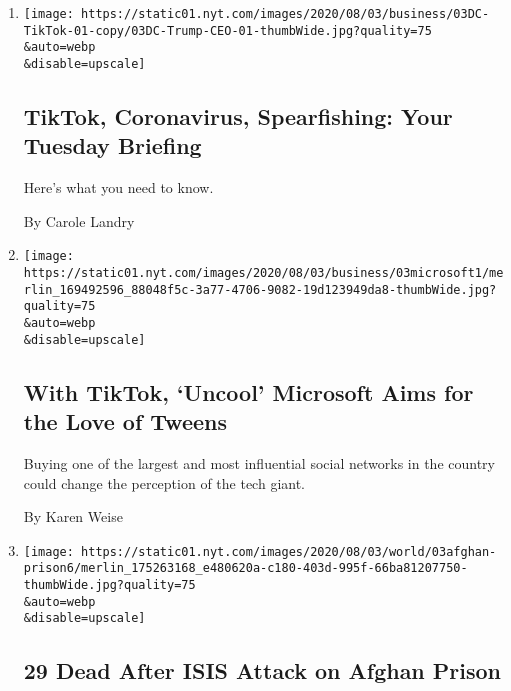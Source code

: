 \begin{enumerate}
\def\labelenumi{\arabic{enumi}.}
\item
  \href{/2020/08/03/briefing/coronavirus-tiktok-afghanistan-australia.html}{}

  \texttt{[image: https://static01.nyt.com/images/2020/08/03/business/03DC-TikTok-01-copy/03DC-Trump-CEO-01-thumbWide.jpg?quality=75\\\&auto=webp\\\&disable=upscale]}

  \hypertarget{tiktok-coronavirus-spearfishing-your-tuesday-briefing}{%
  \subsection{TikTok, Coronavirus, Spearfishing: Your Tuesday
  Briefing}\label{tiktok-coronavirus-spearfishing-your-tuesday-briefing}}

  Here's what you need to know.

  By Carole Landry
\item
  \href{/2020/08/03/technology/tiktok-microsoft-tweens.html}{}

  \texttt{[image: https://static01.nyt.com/images/2020/08/03/business/03microsoft1/merlin\_169492596\_88048f5c-3a77-4706-9082-19d123949da8-thumbWide.jpg?quality=75\\\&auto=webp\\\&disable=upscale]}

  \hypertarget{with-tiktok-uncool-microsoft-aims-for-the-love-of-tweens}{%
  \subsection{With TikTok, `Uncool' Microsoft Aims for the Love of
  Tweens}\label{with-tiktok-uncool-microsoft-aims-for-the-love-of-tweens}}

  Buying one of the largest and most influential social networks in the
  country could change the perception of the tech giant.

  By Karen Weise
\item
  \href{/2020/08/03/world/asia/afghanistan-prison-isis-taliban.html}{}

  \texttt{[image: https://static01.nyt.com/images/2020/08/03/world/03afghan-prison6/merlin\_175263168\_e480620a-c180-403d-995f-66ba81207750-thumbWide.jpg?quality=75\\\&auto=webp\\\&disable=upscale]}

  \hypertarget{29-dead-after-isis-attack-on-afghan-prison}{%
  \subsection{29 Dead After ISIS Attack on Afghan
  Prison}\label{29-dead-after-isis-attack-on-afghan-prison}}


\end{enumerate}
